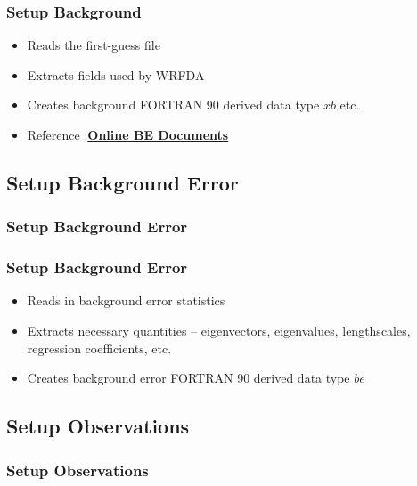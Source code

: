\documentclass{beamer}
\begin{document}
\begin{frame}
\frametitle{Setup Background}
\begin{itemize}
\item Reads the first-guess file \pause
\item Extracts fields used by WRFDA \pause
\item Creates background FORTRAN 90 derived data type $xb$ etc.
\item Reference :\href{http://www.mmm.ucar.edu/wrf/users/wrfda/technotes.html}{{\bf Online BE Documents}}
\end{itemize}
\end{frame}

\subsection{Setup Background Error}
\begin{frame}
\frametitle{Setup Background Error}
\end{frame}

\begin{frame}
\frametitle{Setup Background Error}
\begin{itemize}
\item Reads in background error statistics \pause
\item Extracts necessary quantities – eigenvectors, eigenvalues, lengthscales, regression coefficients, etc.\pause
\item Creates background error FORTRAN 90 derived data type $be$
\end{itemize}
\end{frame}

\subsection{Setup Observations}
\begin{frame}
\frametitle{Setup Observations}
\end{frame}
\end{document}
